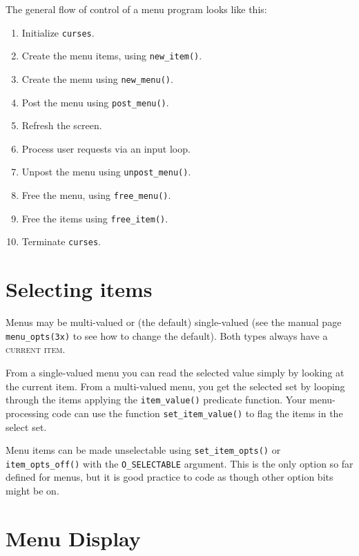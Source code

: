 The general flow of control of a menu program looks like this:
\begin{enumerate}
\item Initialize \texttt{curses}.
\item Create the menu items, using \texttt{new\_item()}.
\item Create the menu using \texttt{new\_menu()}.
\item Post the menu using \texttt{post\_menu()}.
\item Refresh the screen.
\item Process user requests via an input loop.
\item Unpost the menu using \texttt{unpost\_menu()}.
\item Free the menu, using \texttt{free\_menu()}.
\item Free the items using \texttt{free\_item()}.
\item Terminate \texttt{curses}.
\end{enumerate}

\section{Selecting items}

\label{f0:mselect}Menus may be multi-valued or (the default) single-valued (see the manual
page \texttt{menu\_opts(3x)} to see how to change the default).
Both types always have a \textsc{current item}. 

From a single-valued menu you can read the selected value simply by looking
at the current item.  From a multi-valued menu, you get the selected set
by looping through the items applying the \texttt{item\_value()}
predicate function.  Your menu-processing code can use the function
\texttt{set\_item\_value()} to flag the items in the select set. 

Menu items can be made unselectable using \texttt{set\_item\_opts()}
or \texttt{item\_opts\_off()} with the \texttt{O\_SELECTABLE}
argument.  This is the only option so far defined for menus, but it
is good practice to code as though other option bits might be on.

\section{Menu Display}

